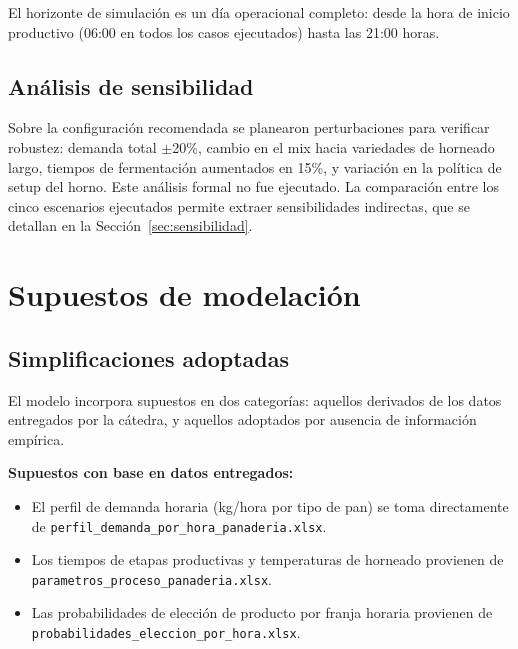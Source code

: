 \documentclass[12pt]{article}
\begin{document}
El horizonte de simulación es un día operacional completo: desde la hora de inicio productivo (06:00 en todos los casos ejecutados) hasta las 21:00 horas.

\subsection{Análisis de sensibilidad}

Sobre la configuración recomendada se planearon perturbaciones para verificar robustez: demanda total $\pm$20\%, cambio en el mix hacia variedades de horneado largo, tiempos de fermentación aumentados en 15\%, y variación en la política de setup del horno. Este análisis formal no fue ejecutado. La comparación entre los cinco escenarios ejecutados permite extraer sensibilidades indirectas, que se detallan en la Sección~\ref{sec:sensibilidad}.

\newpage
\section{Supuestos de modelación}
\label{sec:supuestos}

\subsection{Simplificaciones adoptadas}

El modelo incorpora supuestos en dos categorías: aquellos derivados de los datos entregados por la cátedra, y aquellos adoptados por ausencia de información empírica.

\textbf{Supuestos con base en datos entregados:}
\begin{itemize}
  \item El perfil de demanda horaria (kg/hora por tipo de pan) se toma directamente de \texttt{perfil\_demanda\_por\_hora\_panaderia.xlsx}.
  \item Los tiempos de etapas productivas y temperaturas de horneado provienen de \texttt{parametros\_proceso\_panaderia.xlsx}.
  \item Las probabilidades de elección de producto por franja horaria provienen de \texttt{probabilidades\_eleccion\_por\_hora.xlsx}.
\end{itemize}
\end{document}
